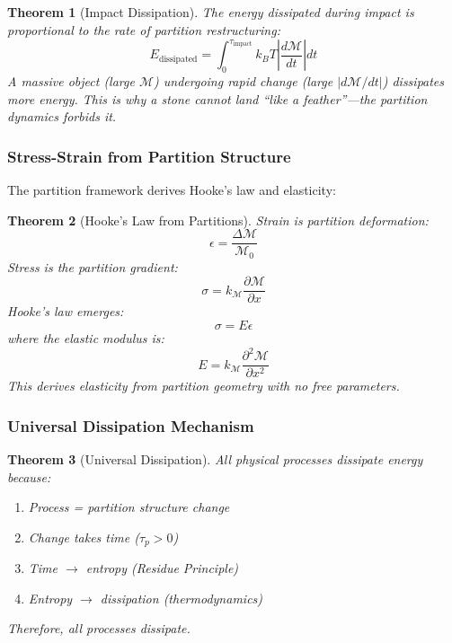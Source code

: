 \documentclass[twocolumn,10pt,a4paper]{article}
\newtheorem{theorem}{Theorem}[section]
\theoremstyle{definition}
\theoremstyle{remark}
\newcommand{\Depth}{\mathcal{M}}
\begin{document}
\begin{theorem}[Impact Dissipation]
\label{thm:impact}
The energy dissipated during impact is proportional to the rate of partition restructuring:
\begin{equation}
    E_{\text{dissipated}} = \int_0^{\tau_{\text{impact}}} k_B T \left| \frac{d\Depth}{dt} \right| dt
\end{equation}
A massive object (large $\Depth$) undergoing rapid change (large $|d\Depth/dt|$) dissipates more energy. This is why a stone cannot land ``like a feather''---the partition dynamics forbids it.
\end{theorem}

\subsubsection{Stress-Strain from Partition Structure}

The partition framework derives Hooke's law and elasticity:

\begin{theorem}[Hooke's Law from Partitions]
\label{thm:hooke}
Strain is partition deformation:
\begin{equation}
    \epsilon = \frac{\Delta \Depth}{\Depth_0}
\end{equation}
Stress is the partition gradient:
\begin{equation}
    \sigma = k_{\Depth} \frac{\partial \Depth}{\partial x}
\end{equation}
Hooke's law emerges:
\begin{equation}
    \sigma = E \epsilon
\end{equation}
where the elastic modulus is:
\begin{equation}
    E = k_{\Depth} \frac{\partial^2 \Depth}{\partial x^2}
\end{equation}
This derives elasticity from partition geometry with no free parameters.
\end{theorem}

\subsubsection{Universal Dissipation Mechanism}

\begin{theorem}[Universal Dissipation]
\label{thm:universal_dissipation}
All physical processes dissipate energy because:
\begin{enumerate}
    \item Process = partition structure change
    \item Change takes time ($\tau_p > 0$)
    \item Time $\to$ entropy (Residue Principle)
    \item Entropy $\to$ dissipation (thermodynamics)
\end{enumerate}
Therefore, all processes dissipate.
\end{theorem}
\end{document}
